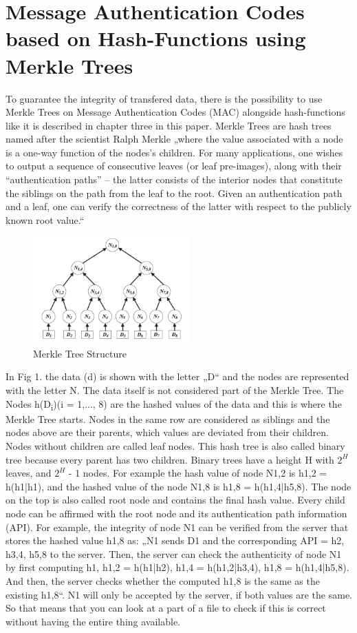 \section{Message Authentication Codes based on Hash-Functions using Merkle Trees}

To guarantee the integrity of transfered data, there is the possibility to use Merkle Trees on Message Authentication Codes (MAC) alongside hash-functions like it is described in chapter three in this paper. Merkle Trees are hash trees named after the scientist Ralph Merkle „where the value associated with a node is a one-way function of the nodes’s children. For many applications, one wishes to output a sequence of consecutive leaves (or leaf pre-images), along with their “authentication paths” – the latter consists of the interior nodes that constitute the siblings on the path from the leaf to the root. Given an authentication path and a leaf, one can verify the correctness of the latter with respect to the publicly known root value.“ \cite{MT} 

\begin{figure}
\centering
\includegraphics[width=6cm]{Pages/Merkle/merkleTree.png}
\caption{Merkle Tree Structure \cite{METR}}
\end{figure}

In Fig 1. the data (d) is shown with the letter „D“ and the nodes are represented with the letter N. The data itself is not considered part of the Merkle Tree. The Nodes h(D\textsubscript{i})(i = 1,..., 8) are the hashed values of the data and this is where the Merkle Tree starts. Nodes in the same row are considered as siblings and the nodes above are their parents, which values are deviated from their children. Nodes without children are called leaf nodes. This hash tree is also called binary tree because every parent has two children. Binary trees have a height H with $ 2^{H} $ leaves, and $  2^{H} $ - 1 nodes. \cite{MT} 
For example the hash value of node N1,2 is h1,2 = h(h1|h1), and the hashed value of the node N1,8 is h1,8 = h(h1,4|h5,8). \cite{METR} The node on the top is also called root node and contains the final hash value. Every child node can be affirmed with the root node and its authentication path information (API). For example, the integrity of node N1 can be verified from the server that stores the hashed value h1,8 as: „N1 sends D1 and the corresponding API = h2, h3,4, h5,8 to the server. Then, the server can check the authenticity of node N1 by first computing h1, h1,2 = h(h1|h2), h1,4 = h(h1,2|h3,4), h1,8 = h(h1,4|h5,8). And then, the server checks whether the computed h1,8 is the same as the existing h1,8“. \cite{METR} N1 will only be accepted by the server, if both values are the same. So that means that you can look at a part of a file to check if this is correct without having the entire thing available.

